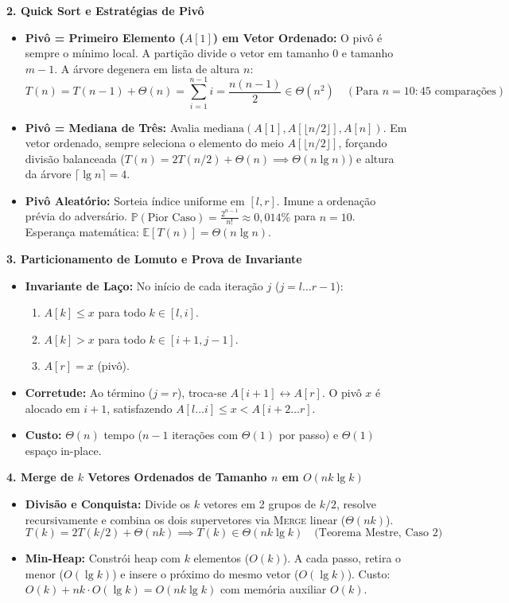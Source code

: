 \documentclass[11pt,a4paper]{article}
\newcommand{\topico}[1]{\par\medskip\textbf{\color{azul}#1}\par}
\begin{document}
\topico{2. Quick Sort e Estratégias de Pivô}
\begin{itemize}
  \item \textbf{Pivô = Primeiro Elemento ($A[1]$) em Vetor Ordenado:} O pivô é sempre o mínimo local. A partição divide o vetor em tamanho $0$ e tamanho $m-1$. A árvore degenera em lista de altura $n$:
  \[
  T(n) = T(n-1) + \Theta(n) = \sum_{i=1}^{n-1} i = \frac{n(n-1)}{2} \in \Theta(n^2) \quad (\text{Para } n=10: 45 \text{ comparações})
  \]
  \item \textbf{Pivô = Mediana de Três:} Avalia $\text{mediana}(A[1], A[\lfloor n/2 \rfloor], A[n])$. Em vetor ordenado, sempre seleciona o elemento do meio $A[\lfloor n/2 \rfloor]$, forçando divisão balanceada ($T(n) = 2T(n/2) + \Theta(n) \implies \Theta(n \lg n)$) e altura da árvore $\lceil \lg n \rceil = 4$.
  \item \textbf{Pivô Aleatório:} Sorteia índice uniforme em $[l, r]$. Imune a ordenação prévia do adversário. $\mathbb{P}(\text{Pior Caso}) = \frac{2^{n-1}}{n!} \approx 0{,}014\%$ para $n=10$. Esperança matemática: $\mathbb{E}[T(n)] = \Theta(n \lg n)$.
\end{itemize}

\topico{3. Particionamento de Lomuto e Prova de Invariante}
\begin{itemize}
  \item \textbf{Invariante de Laço:} No início de cada iteração $j$ ($j = l \dots r-1$):
  \begin{enumerate}
    \item $A[k] \le x$ para todo $k \in [l, i]$.
    \item $A[k] > x$ para todo $k \in [i+1, j-1]$.
    \item $A[r] = x$ (pivô).
  \end{enumerate}
  \item \textbf{Corretude:} Ao término ($j=r$), troca-se $A[i+1] \leftrightarrow A[r]$. O pivô $x$ é alocado em $i+1$, satisfazendo $A[l \dots i] \le x < A[i+2 \dots r]$.
  \item \textbf{Custo:} $\Theta(n)$ tempo ($n-1$ iterações com $\Theta(1)$ por passo) e $\Theta(1)$ espaço in-place.
\end{itemize}

\topico{4. Merge de $k$ Vetores Ordenados de Tamanho $n$ em $O(nk \lg k)$}
\begin{itemize}
  \item \textbf{Divisão e Conquista:} Divide os $k$ vetores em 2 grupos de $k/2$, resolve recursivamente e combina os dois supervetores via \textsc{Merge} linear ($\Theta(nk)$).
  \[
  T(k) = 2T(k/2) + \Theta(nk) \implies T(k) \in \Theta(nk \lg k) \quad \text{(Teorema Mestre, Caso 2)}
  \]
  \item \textbf{Min-Heap:} Constrói heap com $k$ elementos ($O(k)$). A cada passo, retira o menor ($O(\lg k)$) e insere o próximo do mesmo vetor ($O(\lg k)$). Custo: $O(k) + nk \cdot O(\lg k) = O(nk \lg k)$ com memória auxiliar $O(k)$.
\end{itemize}
\end{document}
